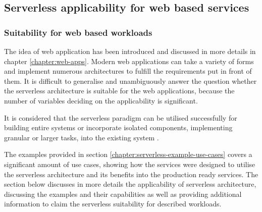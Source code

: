 \subsection{Serverless applicability for web based services}

\subsubsection*{Suitability for web based workloads} \label{chapter:serverless-suitability-for-web-based-workloads}

The idea of web application has been introduced and discussed in more details in chapter \ref{chapter:web-apps}. Modern web applications can take a variety of forms and implement numerous architectures to fulfill the requirements put in front of them.
It is difficult to generalise and unambiguously answer the question whether the serverless architecture is suitable for the web applications, because the number of variables deciding on the applicability is significant.

It is considered that the serverless paradigm can be utilised successfully for building entire systems or incorporate isolated components, implementing granular or larger tasks, into the existing system \cite{ServerlessArchitectureOnAWS}.

The examples provided in section \ref{chapter:serverless-example-use-cases} covers a significant amount of use cases, showing how the services were designed to utilise the serverless architecture and its benefits into the production ready services. The section below discusses in more details the applicability of serverless architecture, discussing the examples and their capabilities as well as providing additional information to claim the serverless suitability for described workloads.



